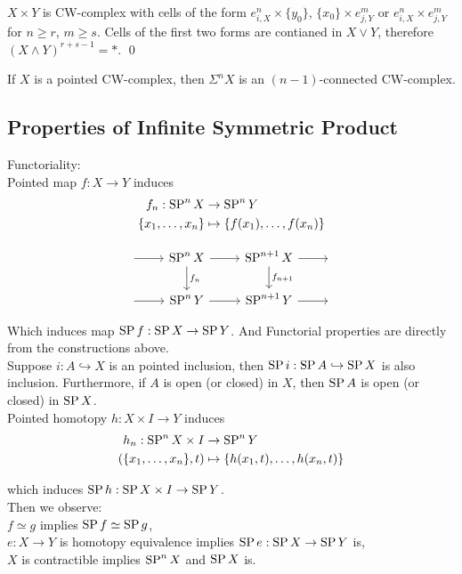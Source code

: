     \begin{prf}
        $X \times Y$ is CW-complex with cells of the form
        $e^n_{i,X} \times \{y_0\}$, $\{x_0\} \times e^m_{j,Y}$
        or $e^n_{i,X} \times e^m_{j,Y}$
        for $n \geq r$, $m \geq s$.
        Cells of the first two forms are contianed in $X \vee Y$,
        therefore $(X \wedge Y)^{r+s-1} = \ast$.
        \qed
    \end{prf}

    \begin{cor}
        If $X$ is a pointed CW-complex,
        then $\Sigma^n X$ is an $(n-1)$-connected CW-complex.
    \end{cor}

    \subsection{Properties of Infinite Symmetric Product}
    Functoriality:\\

    Pointed map $f : X \to Y$
    induces
    \begin{align*}
        f_n : \operatorname{SP}^n X & \to \operatorname{SP}^{n}Y\\
            \{x_1, \dots, x_n\} & \mapsto \{f(x_1), \dots, f(x_n)\}
    \end{align*}
    
    \[\begin{tikzcd}
        {} & {\SP^n X} & {\SP^{n+1}X} & {} \\
        {} & {\SP^nY} & {\SP^{n+1} Y} & {}
        \arrow[from=1-2, to=1-3]
        \arrow[from=1-1, to=1-2]
        \arrow[from=2-1, to=2-2]
        \arrow["{f_n}", from=1-2, to=2-2]
        \arrow[from=2-2, to=2-3]
        \arrow["{f_{n+1}}", from=1-3, to=2-3]
        \arrow[from=2-3, to=2-4]
        \arrow[from=1-3, to=1-4]
    \end{tikzcd}\]

    Which induces map $\operatorname{SP} f : \operatorname{SP} X \to \operatorname{SP} Y$.
    And Functorial properties are directly from the constructions above.\\

    Suppose $i : A \hookrightarrow X$ is an pointed inclusion,
    then $\operatorname{SP} i : \operatorname{SP} A \hookrightarrow \operatorname{SP} X$ is also inclusion.
    Furthermore, if $A$ is open (or closed) in $X$, then $\operatorname{SP} A$ is open (or closed) in $\operatorname{SP} X$.\\

    Pointed homotopy $h : X \times I \to Y$ induces
    \begin{align*}
        h_n : \operatorname{SP}^n X \times I & \to \operatorname{SP}^{n}Y\\
            (\{x_1, \dots, x_n\} , t) & \mapsto \{h(x_1,t), \dots, h(x_n,t)\}
    \end{align*}
    
    which induces $\operatorname{SP} h : \operatorname{SP} X \times I \to \operatorname{SP} Y$.\\


    Then we observe:\\
    $f \simeq g$ implies $\operatorname{SP} f \simeq \operatorname{SP} g$,\\
    $e : X \to Y$ is homotopy equivalence implies $\operatorname{SP} e : \operatorname{SP} X \to \operatorname{SP} Y$ is,\\
    $X$ is contractible implies $\operatorname{SP}^n X$ and $\operatorname{SP} X$ is.

